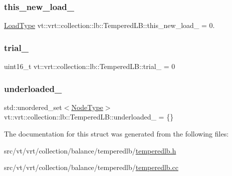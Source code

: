 \subsubsection{\texorpdfstring{this\+\_\+new\+\_\+load\+\_\+}{this\_new\_load\_}}
{\footnotesize\ttfamily \hyperlink{namespacevt_a8fb51741340b87d7aaee0bef60e9896b}{Load\+Type} vt\+::vrt\+::collection\+::lb\+::\+Tempered\+L\+B\+::this\+\_\+new\+\_\+load\+\_\+ = 0.\hspace{0.3cm}{\ttfamily [private]}}

\mbox{\label{structvt_1_1vrt_1_1collection_1_1lb_1_1_tempered_l_b_a59a375e446dafe37a14aa784cea0af2b}} 
\subsubsection{\texorpdfstring{trial\+\_\+}{trial\_}}
{\footnotesize\ttfamily uint16\+\_\+t vt\+::vrt\+::collection\+::lb\+::\+Tempered\+L\+B\+::trial\+\_\+ = 0\hspace{0.3cm}{\ttfamily [private]}}

\mbox{\label{structvt_1_1vrt_1_1collection_1_1lb_1_1_tempered_l_b_a1fecccd06fbeae5e5632998140a3b3b7}} 
\subsubsection{\texorpdfstring{underloaded\+\_\+}{underloaded\_}}
{\footnotesize\ttfamily std\+::unordered\+\_\+set$<$\hyperlink{namespacevt_a866da9d0efc19c0a1ce79e9e492f47e2}{Node\+Type}$>$ vt\+::vrt\+::collection\+::lb\+::\+Tempered\+L\+B\+::underloaded\+\_\+ = \{\}\hspace{0.3cm}{\ttfamily [private]}}



The documentation for this struct was generated from the following files\+:\begin{DoxyCompactItemize}
\item 
src/vt/vrt/collection/balance/temperedlb/\hyperlink{temperedlb_8h}{temperedlb.\+h}\item 
src/vt/vrt/collection/balance/temperedlb/\hyperlink{temperedlb_8cc}{temperedlb.\+cc}\end{DoxyCompactItemize}

